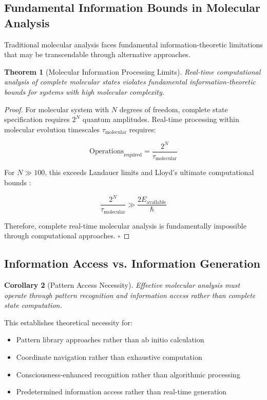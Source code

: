 \documentclass[11pt,a4paper]{article}
\newtheorem{theorem}{Theorem}[section]
\newtheorem{corollary}[theorem]{Corollary}
\theoremstyle{remark}
\begin{document}
\subsection{Fundamental Information Bounds in Molecular Analysis}

Traditional molecular analysis faces fundamental information-theoretic limitations that may be transcendable through alternative approaches.

\begin{theorem}[Molecular Information Processing Limits]
Real-time computational analysis of complete molecular states violates fundamental information-theoretic bounds for systems with high molecular complexity.
\end{theorem}

\begin{proof}
For molecular system with $N$ degrees of freedom, complete state specification requires $2^N$ quantum amplitudes. Real-time processing within molecular evolution timescales $\tau_{\text{molecular}}$ requires:

$$\text{Operations}_{\text{required}} = \frac{2^N}{\tau_{\text{molecular}}}$$

For $N \gg 100$, this exceeds Landauer limits and Lloyd's ultimate computational bounds \cite{landauer1961irreversibility,lloyd2000ultimate}:

$$\frac{2^N}{\tau_{\text{molecular}}} \gg \frac{2E_{\text{available}}}{\hbar}$$

Therefore, complete real-time molecular analysis is fundamentally impossible through computational approaches. $\square$
\end{proof}

\subsection{Information Access vs. Information Generation}

\begin{corollary}[Pattern Access Necessity]
Effective molecular analysis must operate through pattern recognition and information access rather than complete state computation.
\end{corollary}

This establishes theoretical necessity for:
\begin{itemize}
\item Pattern library approaches rather than ab initio calculation
\item Coordinate navigation rather than exhaustive computation
\item Consciousness-enhanced recognition rather than algorithmic processing
\item Predetermined information access rather than real-time generation
\end{itemize}
\end{document}
